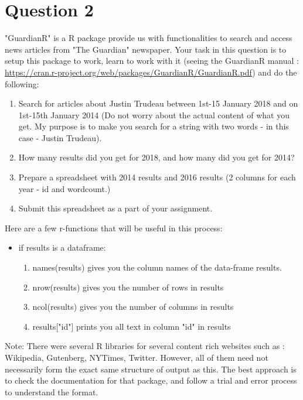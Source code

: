 \documentclass[11pt,a4paper]{article}
\begin{document}
\section*{Question 2}
"GuardianR" is a R package provide us with functionalities to search and access news articles from "The Guardian" newspaper. Your task in this question is to setup this package to work, learn to work with it (seeing the GuardianR manual : \url{https://cran.r-project.org/web/packages/GuardianR/GuardianR.pdf}) and do the following: 
\begin{enumerate}
\item Search for articles about Justin Trudeau between 1st-15 January 2018 and on 1st-15th January 2014 (Do not worry about the actual content of what you get. My purpose is to make you search for a string with two words - in this case - Justin Trudeau).
\item How many results did you get for 2018, and how many did you get for 2014?
\item Prepare a spreadsheet with 2014 results and 2016 results (2 columns for each year - id and wordcount.)
\item Submit this spreadsheet as a part of your assignment. 
\end{enumerate}
Here are a few r-functions that will be useful in this process:
\begin{itemize} 
\item if results is a dataframe:
\begin{enumerate}
\item names(results) gives you the column names of the data-frame results.
\item nrow(results) gives you the number of rows in results
\item ncol(results) gives you the number of columns in results
\item results["id"] prints you all text in column "id" in results
\end{enumerate}
\end{itemize}
Note: There were several R libraries for several content rich websites such as : Wikipedia, Gutenberg, NYTimes, Twitter. However, all of them need not necessarily form the exact same structure of output as this. The best approach is to check the documentation for that package, and follow a trial and error process to understand the format. 
\end{document}
